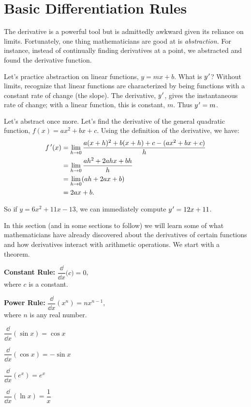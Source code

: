 \section{Basic Differentiation Rules}\label{sec:basic_diff_rules}

The derivative is a powerful tool but is admittedly awkward given its reliance on limits. Fortunately, one thing mathematicians are good at is \emph{abstraction.} For instance, instead of continually finding derivatives at a point, we abstracted and found the derivative function. 

Let's practice abstraction on linear functions, $y=mx+b$. What is $y\primeskip'$? Without limits, recognize that linear functions are characterized by being functions with a constant rate of change (the slope). The derivative, $y\primeskip'$, gives the instantaneous rate of change; with a linear function, this is constant, $m$. Thus $y\primeskip'=m$. 

Let's abstract once more. Let's find the derivative of the general quadratic function, $f(x) = ax^2+bx+c$. Using the definition of the derivative, we have:
\begin{align*}
	f\,'(x)
	&=	\lim_{h\to 0}\frac{a(x+h)^2+b(x+h)+c-(ax^2+bx+c)}{h} \\
	&=	\lim_{h\to 0} \frac{ah^2+2ahx+bh}{h} \\
	&=	\lim_{h\to 0}(ah+2ax+b)\\
	&= 2ax+b.
\end{align*}
		
So if $y = 6x^2+11x-13$, we can immediately compute $y\primeskip' = 12x+11$.\bigskip

In this section (and in some sections to follow) we will learn some of what mathematicians have already discovered about the derivatives of certain functions and how derivatives interact with arithmetic operations. We start with a theorem.

\begin{theorem}\label{thm:deriv_common}%
\begin{enumext*}[columns=2]
\item \textbf{Constant Rule:} $\dfrac \dd{\dd x}\bigl( c\bigr) = 0$,\\
\null\quad where $c$ is a constant.
\item \textbf{Power Rule:} $\dfrac \dd{\dd x}\left(x^n\right) = nx^{n-1}$,\\
\null\quad where $n$ is any real number.
\item $\dfrac \dd{\dd x}(\sin x) = \cos x$
\item $\dfrac \dd{\dd x}(\cos x) = -\sin x$\smallskip
\item $\dfrac \dd{\dd x}\left(e^x\right) = e^x$
\item $\dfrac \dd{\dd x}(\ln x) = \dfrac1x$
\end{enumext*}
\end{theorem}


